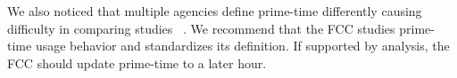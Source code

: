 We also noticed that multiple agencies define prime-time differently causing
difficulty in comparing studies ~\cite{sandvine2014report1, independent-rush-hour}. We recommend that the FCC studies prime-time usage behavior and standardizes its definition. If supported by analysis, the FCC should update prime-time to a later hour.%
